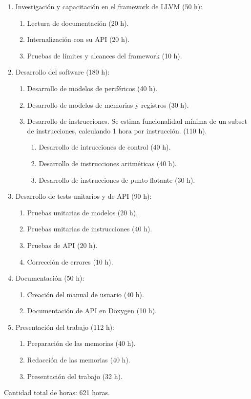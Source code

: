 \begin{enumerate}
\item Investigación y capacitación en el framework de LLVM (50 h):

  \begin{enumerate}
  \item Lectura de documentación (20 h).
  \item Internalización con su API (20 h).
  \item Pruebas de límites y alcances del framework (10 h).
  \end{enumerate}

\item Desarrollo del software (180 h):

  \begin{enumerate}
  \item Desarrollo de modelos de periféricos (40 h).
  \item Desarrollo de modelos de memorias y registros (30 h).
  \item Desarrollo de instrucciones. Se estima funcionalidad mínima de un subset de instrucciones, calculando 1 hora por instrucción. (110 h).
    \begin{enumerate}
      \item Desarrollo de intrucciones de control (40 h).
      \item Desarrollo de instrucciones aritméticas (40 h).
      \item Desarrollo de instrucciones de punto flotante (30 h).
    \end{enumerate}

  \end{enumerate}


\item Desarrollo de tests unitarios y de API (90 h):

  \begin{enumerate}
  \item Pruebas unitarias de modelos (20 h).
  \item Pruebas unitarias de instrucciones (40 h).
  \item Pruebas de API (20 h).
  \item Corrección de errores (10 h).
  \end{enumerate}

\item Documentación (50 h):

\begin{enumerate}
\item Creación del manual de usuario (40 h).
\item Documentación de API en Doxygen (10 h).
\end{enumerate}

\item Presentación del trabajo (112 h):

  \begin{enumerate}
  \item Preparación de las memorias (40 h).
  \item Redacción de las memorias (40 h).
  \item Presentación del trabajo (32 h).
  \end{enumerate}
\end{enumerate}

Cantidad total de horas: 621 horas.
